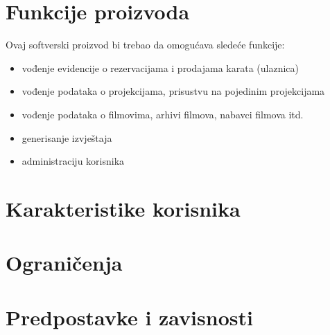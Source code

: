 \section{Funkcije proizvoda}
Ovaj softverski proizvod bi trebao da omogućava sledeće funkcije:
\begin{itemize}
  \item vođenje evidencije o rezervacijama i prodajama karata (ulaznica)
  \item vođenje podataka o projekcijama, prisustvu na pojedinim projekcijama
  \item vođenje podataka o filmovima, arhivi filmova, nabavci filmova itd.
  \item generisanje  izvještaja
  \item administraciju korisnika  
\end{itemize}

\section{Karakteristike korisnika}

\section{Ograničenja}
\section{Predpostavke i zavisnosti}
